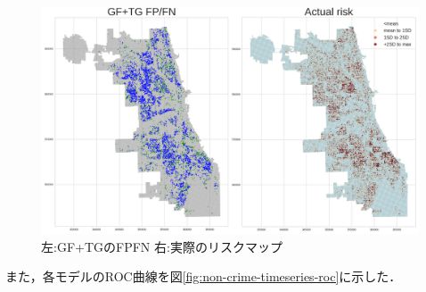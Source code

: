 \begin{figure}
  \centering %
  \includegraphics[scale=0.25]{./non-crime-timeseries-fig/GF+TG_fnp.png}
  \caption{左:GF+TGのFPFN 右:実際のリスクマップ}
  \label{fig:non-crime-timeseries-gf-tg-fnp}
\end{figure}
また，各モデルのROC曲線を図\ref{fig:non-crime-timeseries-roc}に示した．

